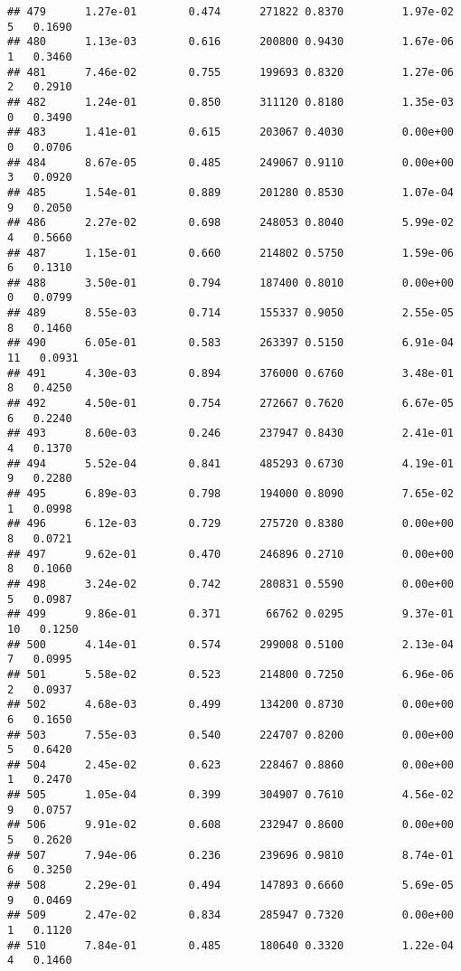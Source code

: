 \documentclass[
]{article}
\begin{document}
\begin{verbatim}
## 479      1.27e-01        0.474      271822 0.8370         1.97e-02   5   0.1690
## 480      1.13e-03        0.616      200800 0.9430         1.67e-06   1   0.3460
## 481      7.46e-02        0.755      199693 0.8320         1.27e-06   2   0.2910
## 482      1.24e-01        0.850      311120 0.8180         1.35e-03   0   0.3490
## 483      1.41e-01        0.615      203067 0.4030         0.00e+00   0   0.0706
## 484      8.67e-05        0.485      249067 0.9110         0.00e+00   3   0.0920
## 485      1.54e-01        0.889      201280 0.8530         1.07e-04   9   0.2050
## 486      2.27e-02        0.698      248053 0.8040         5.99e-02   4   0.5660
## 487      1.15e-01        0.660      214802 0.5750         1.59e-06   6   0.1310
## 488      3.50e-01        0.794      187400 0.8010         0.00e+00   0   0.0799
## 489      8.55e-03        0.714      155337 0.9050         2.55e-05   8   0.1460
## 490      6.05e-01        0.583      263397 0.5150         6.91e-04  11   0.0931
## 491      4.30e-03        0.894      376000 0.6760         3.48e-01   8   0.4250
## 492      4.50e-01        0.754      272667 0.7620         6.67e-05   6   0.2240
## 493      8.60e-03        0.246      237947 0.8430         2.41e-01   4   0.1370
## 494      5.52e-04        0.841      485293 0.6730         4.19e-01   9   0.2280
## 495      6.89e-03        0.798      194000 0.8090         7.65e-02   1   0.0998
## 496      6.12e-03        0.729      275720 0.8380         0.00e+00   8   0.0721
## 497      9.62e-01        0.470      246896 0.2710         0.00e+00   8   0.1060
## 498      3.24e-02        0.742      280831 0.5590         0.00e+00   5   0.0987
## 499      9.86e-01        0.371       66762 0.0295         9.37e-01  10   0.1250
## 500      4.14e-01        0.574      299008 0.5100         2.13e-04   7   0.0995
## 501      5.58e-02        0.523      214800 0.7250         6.96e-06   2   0.0937
## 502      4.68e-03        0.499      134200 0.8730         0.00e+00   6   0.1650
## 503      7.55e-03        0.540      224707 0.8200         0.00e+00   5   0.6420
## 504      2.45e-02        0.623      228467 0.8860         0.00e+00   1   0.2470
## 505      1.05e-04        0.399      304907 0.7610         4.56e-02   9   0.0757
## 506      9.91e-02        0.608      232947 0.8600         0.00e+00   5   0.2620
## 507      7.94e-06        0.236      239696 0.9810         8.74e-01   6   0.3250
## 508      2.29e-01        0.494      147893 0.6660         5.69e-05   9   0.0469
## 509      2.47e-02        0.834      285947 0.7320         0.00e+00   1   0.1120
## 510      7.84e-01        0.485      180640 0.3320         1.22e-04   4   0.1460

\end{verbatim}
\end{document}
